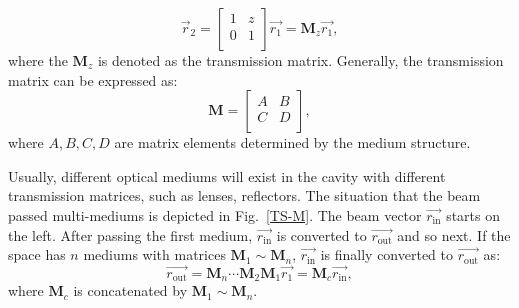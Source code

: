 \documentclass{IEEEtran}
\begin{document}
\begin{equation}\label{tx01}
\vec{r}_2 =\left[ \begin{array}{cc}1 & z \\0 & 1 \\\end{array} \right ]\vec{r_1}= \mathbf{M}_z \vec{r_1},
\end{equation} 
where the $\mathbf{M}_z$ is denoted as the transmission matrix. Generally, the transmission matrix can be expressed as:
\begin{equation}
    \mathbf{M} =\left[ \begin{array}{cc}A & B \\C & D \\\end{array} \right ],
\end{equation}
where $A, B, C, D$ are matrix elements determined by the medium structure. %

Usually, different optical mediums will exist in the cavity with different transmission matrices, such as lenses, reflectors. The situation that the beam passed multi-mediums is depicted in Fig.~\ref{TS-M}. The beam vector $\vec{r_\mathrm{in}}$ starts on the left. After passing the first medium, $\vec{r_\mathrm{in}}$ is converted to $\vec{r_\mathrm{out}}$ and so next. If the space has $n$ mediums with matrices $\mathbf{M}_1 \sim \mathbf{M}_n$, $\vec{r_\mathrm{in}}$ is finally converted to $\vec{r_\mathrm{out}}$ as:
\begin{equation}\label{tx1}
\vec{r_\mathrm{out}} = \mathbf{M}_n\cdots \mathbf{M}_2\mathbf{M}_1 \vec{r_1}=\mathbf{M}_c\vec{r_\mathrm{in}},
\end{equation}
where $\mathbf{M}_c$ is concatenated by $\mathbf{M}_1 \sim \mathbf{M}_n$. 
\end{document}
